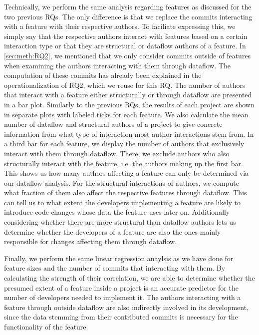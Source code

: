 Technically, we perform the same analysis regarding features as discussed for the two previous RQs.
The only difference is that we replace the commits interacting with a feature with their respective authors.
To faciliate expressing this, we simply say that the respective authors interact with features based on a certain interaction type or that they are structural or dataflow authors of a feature.
In \autoref{sec:meth:RQ2}, we mentioned that we only consider commits outside of features when examining the authors interacting with them through dataflow.
The computation of these commits has already been explained in the operationalization of RQ2, which we reuse for this RQ.
The number of authors that interact with a feature either structurally or through dataflow are presented in a bar plot.
Similarly to the previous RQs, the results of each project are shown in separate plots with labeled ticks for each feature.
We also calculate the mean number of dataflow and structural authors of a project to give concrete information from what type of interaction most author interactions stem from.
In a third bar for each feature, we display the number of authors that exclusively interact with them through dataflow.
There, we exclude authors who also structurally interact with the feature, i.e. the authors making up the first bar.
This shows us how many authors affecting a feature can only be determined via our dataflow analysis.
For the structural interactions of authors, we compute what fraction of them also affect the respective features through dataflow.
This can tell us to what extent the developers implementing a feature are likely to introduce code changes whose data the feature uses later on.
Additionally considering whether there are more structural than dataflow authors lets us determine whether the developers of a feature are also the ones mainly responsible for changes affecting them through dataflow.

Finally, we perform the same linear regression anaylsis as we have done for feature sizes and the number of commits that interacting with them.
By calculating the strength of their correlation, we are able to determine whether the presumed extent of a feature inside a project is an accurate predictor for the number of developers needed to implement it.
The authors interacting with a feature through outside dataflow are also indirectly involved in its development, since the data stemming from their contributed commits is necessary for the functionality of the feature.
